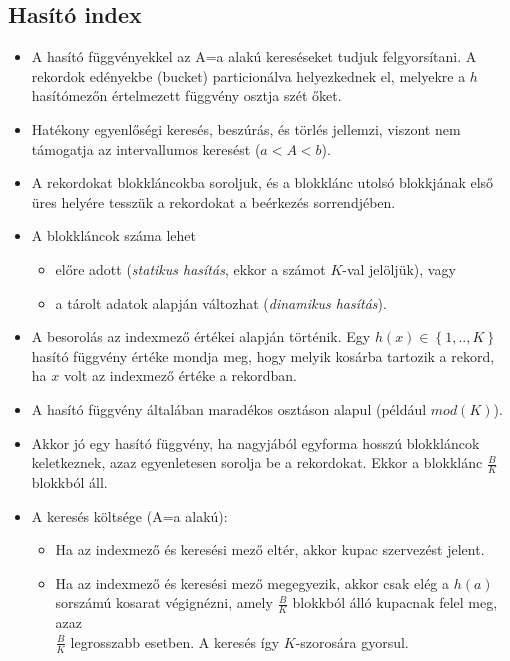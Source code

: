 \documentclass[12pt,margin=0px]{article}
\newcommand\ddfrac[2]{\frac{\displaystyle #1}{\displaystyle #2}}
\begin{document}
	\subsection*{Hasító index}
    \begin{itemize}
    	\item A hasító függvényekkel az A=a alakú kereséseket tudjuk felgyorsítani. A rekordok edényekbe (bucket) particionálva helyezkednek el, melyekre a $h$ hasítómezőn értelmezett függvény osztja szét őket.
        \item Hatékony egyenlőségi keresés, beszúrás, és törlés jellemzi, viszont nem támogatja az intervallumos keresést ($a < A < b$).
    	\item A rekordokat blokkláncokba soroljuk, és a blokklánc utolsó blokkjának első üres helyére tesszük a rekordokat a beérkezés sorrendjében.
        \item A blokkláncok száma lehet
        \begin{itemize}
            \item előre adott (\emph{statikus hasítás}, ekkor a számot $K$-val jelöljük), vagy
            \item a tárolt adatok alapján változhat (\emph{dinamikus hasítás}).
        \end{itemize}
    	\item A besorolás az indexmező értékei alapján történik. Egy $h(x) \in \left\{1,..,K\right\}$ hasító függvény értéke mondja meg,
    	hogy melyik kosárba tartozik a rekord, ha $x$ volt az indexmező értéke a rekordban.
        \item A hasító függvény általában maradékos osztáson alapul (például $mod(K)$).
        \item Akkor jó egy hasító függvény, ha nagyjából egyforma hosszú blokkláncok keletkeznek, azaz egyenletesen sorolja be a rekordokat. Ekkor a blokklánc $\ddfrac{B}{K}$ blokkból áll.
\newpage
    	\item  A keresés költsége (A=a alakú):
        	\begin{itemize}
        		\item	Ha az indexmező és keresési mező eltér, akkor kupac szervezést jelent.
        		\item	Ha az indexmező és keresési mező megegyezik, akkor csak elég a $h(a)$ sorszámú kosarat végignézni,
        		amely $\ddfrac{B}{K}$ blokkból álló kupacnak felel meg, azaz\\
                $\ddfrac{B}{K}$ legrosszabb esetben.
        		A keresés így $K$-szorosára gyorsul.
        	\end{itemize}

\end{itemize}
\end{document}
